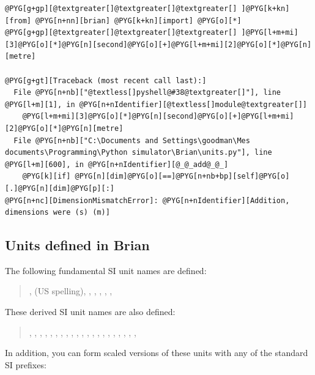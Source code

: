 \documentclass[letterpaper,10pt,english]{manual}
\begin{document}
\begin{Verbatim}[commandchars=@\[\]]
@PYG[g+gp][@textgreater[]@textgreater[]@textgreater[] ]@PYG[k+kn][from] @PYG[n+nn][brian] @PYG[k+kn][import] @PYG[o][*]
@PYG[g+gp][@textgreater[]@textgreater[]@textgreater[] ]@PYG[l+m+mi][3]@PYG[o][*]@PYG[n][second]@PYG[o][+]@PYG[l+m+mi][2]@PYG[o][*]@PYG[n][metre]

@PYG[g+gt][Traceback (most recent call last):]
  File @PYG[n+nb]["@textless[]pyshell@#38@textgreater[]"], line @PYG[l+m][1], in @PYG[n+nIdentifier][@textless[]module@textgreater[]]
    @PYG[l+m+mi][3]@PYG[o][*]@PYG[n][second]@PYG[o][+]@PYG[l+m+mi][2]@PYG[o][*]@PYG[n][metre]
  File @PYG[n+nb]["C:\Documents and Settings\goodman\Mes documents\Programming\Python simulator\Brian\units.py"], line @PYG[l+m][600], in @PYG[n+nIdentifier][@_@_add@_@_]
    @PYG[k][if] @PYG[n][dim]@PYG[o][==]@PYG[n+nb+bp][self]@PYG[o][.]@PYG[n][dim]@PYG[p][:]
@PYG[n+nc][DimensionMismatchError]: @PYG[n+nIdentifier][Addition, dimensions were (s) (m)]
\end{Verbatim}


\subsection{Units defined in Brian}

The following fundamental SI unit names are defined:
\begin{quote}

,  (US spelling), , , , , , 
\end{quote}

These derived SI unit names are also defined:
\begin{quote}

, , , , , , ,
, , , , , , ,
, , , , , , , 
\end{quote}

In addition, you can form scaled versions of these units with any of the standard SI prefixes:
\end{document}
